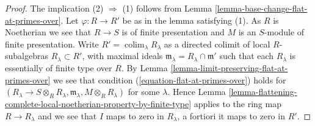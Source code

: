 \documentclass[10pt,a4paper]{amsart}
\theoremstyle{plain}
\theoremstyle{definition}
\theoremstyle{remark}
\numberwithin{equation}{subsection}
\def\colim{\mathop{\mathrm{colim}}\nolimits}
\begin{document}
\begin{proof}
The implication (2) $\Rightarrow$ (1) follows from
Lemma \ref{lemma-base-change-flat-at-primes-over}.
Let $\varphi : R \to R'$ be as in the lemma satisfying (1).
As $R$ is Noetherian we see that $R \to S$ is of finite presentation
and $M$ is an $S$-module of finite presentation.
Write $R' = \colim_\lambda R_\lambda$
as a directed colimit of local $R$-subalgebras $R_\lambda \subset R'$,
with maximal ideals $\mathfrak m_\lambda = R_\lambda \cap \mathfrak m'$
such that each $R_\lambda$ is essentially of finite type over $R$. By
Lemma \ref{lemma-limit-preserving-flat-at-primes-over}
we see that condition (\ref{equation-flat-at-primes-over}) holds for
$(R_\lambda \to S \otimes_R R_\lambda, \mathfrak m_\lambda,
M \otimes_R R_\lambda)$ for some $\lambda$. Hence
Lemma \ref{lemma-flattening-complete-local-noetherian-property-by-finite-type}
applies to the ring map $R \to R_\lambda$ and we see that
$I$ maps to zero in $R_\lambda$, a fortiori it maps to zero in $R'$.
\end{proof}
\end{document}
